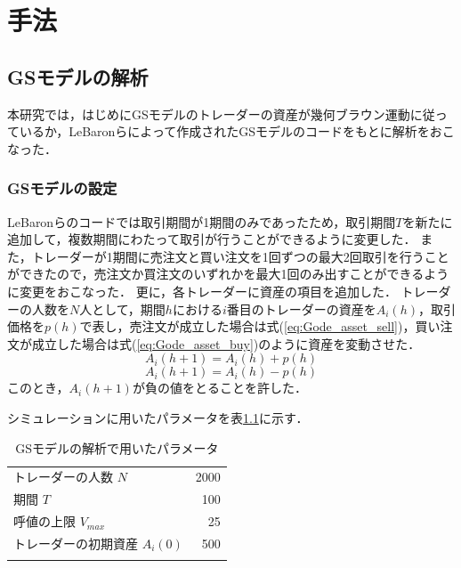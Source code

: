 \documentclass[titlepage]{jsreport}
\begin{document}
\chapter{手法} \label{chap:method}
\section{GSモデルの解析}
本研究では，はじめにGSモデルのトレーダーの資産が幾何ブラウン運動に従っているか，LeBaronらによって作成されたGSモデルのコード\cite{Gode_and_Sunder_code}をもとに解析をおこなった．

\subsection{GSモデルの設定}
LeBaronらのコードでは取引期間が1期間のみであったため，取引期間$T$を新たに追加して，複数期間にわたって取引が行うことができるように変更した．
また，トレーダーが1期間に売注文と買い注文を1回ずつの最大2回取引を行うことができたので，売注文か買注文のいずれかを最大1回のみ出すことができるように変更をおこなった．
更に，各トレーダーに資産の項目を追加した．
トレーダーの人数を$N$人として，期間$h$における$i$番目のトレーダーの資産を$A_i(h)$，取引価格を$p(h)$で表し，売注文が成立した場合は式(\ref{eq:Gode_asset_sell})，買い注文が成立した場合は式(\ref{eq:Gode_asset_buy})のように資産を変動させた．
\begin{equation}
    A_i(h + 1) = A_i(h) + p(h) \label{eq:Gode_asset_sell}
\end{equation}
\begin{equation}
    A_i(h + 1) = A_i(h) - p(h) \label{eq:Gode_asset_buy}
\end{equation}
このとき，$A_i(h + 1)$が負の値をとることを許した．

シミュレーションに用いたパラメータを表\ref{tbl:Gode_param}に示す．

\begin{table}[htbp]
    \begin{center}
        \caption{GSモデルの解析で用いたパラメータ}
        \begin{tabular}{lr}
            \hline\hline
            トレーダーの人数 $N$          & 2000 \\
            期間 $T$                      & 100  \\
            呼値の上限 $V_{max} $         & 25   \\
            トレーダーの初期資産 $A_i(0)$ & 500  \\ \hline
            \label{tbl:Gode_param}
        \end{tabular}
    \end{center}
\end{table}
\end{document}
